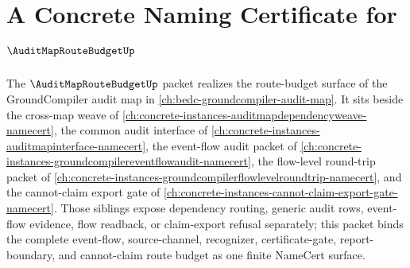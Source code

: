 \chapter{A Concrete Naming Certificate for $\AuditMapRouteBudgetUp$}
\label{ch:concrete-instances-auditmaproutebudget-namecert}

The $\AuditMapRouteBudgetUp$ packet realizes the route-budget surface of the GroundCompiler audit map in \autoref{ch:bedc-groundcompiler-audit-map}. It sits beside the cross-map weave of \autoref{ch:concrete-instances-auditmapdependencyweave-namecert}, the common audit interface of \autoref{ch:concrete-instances-auditmapinterface-namecert}, the event-flow audit packet of \autoref{ch:concrete-instances-groundcompilereventflowaudit-namecert}, the flow-level round-trip packet of \autoref{ch:concrete-instances-groundcompilerflowlevelroundtrip-namecert}, and the cannot-claim export gate of \autoref{ch:concrete-instances-cannot-claim-export-gate-namecert}. Those siblings expose dependency routing, generic audit rows, event-flow evidence, flow readback, or claim-export refusal separately; this packet binds the complete event-flow, source-channel, recognizer, certificate-gate, report-boundary, and cannot-claim route budget as one finite NameCert surface.


